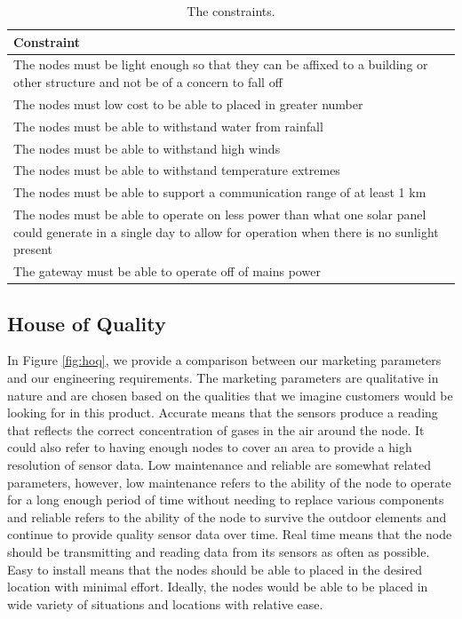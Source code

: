 \begin{table}[H]
\centering
\caption{The constraints.}
\begin{tabularx}{\linewidth}{|X|}
\hline
Constraint \\
\hline
The nodes must be light enough so that they can be affixed to a building or other structure and not be of a concern to fall off \\\hline
The nodes must low cost to be able to placed in greater number \\\hline
The nodes must be able to withstand water from rainfall \\\hline
The nodes must be able to withstand high winds \\\hline
The nodes must be able to withstand temperature extremes \\\hline
The nodes must be able to support a communication range of at least 1 km\\\hline
The nodes must be able to operate on less power than what one solar panel could generate in a single day to allow for operation when there is no sunlight present \\\hline
The gateway must be able to operate off of mains power \\\hline
\end{tabularx}
\label{tab:constraints}
\end{table}

\subsection{House of Quality}
In Figure \ref{fig:hoq}, we provide a comparison between our marketing
parameters and our engineering requirements. The marketing parameters are
qualitative in nature and are chosen based on the qualities that we imagine
customers would be looking for in this product. Accurate means that the sensors
produce a reading that reflects the correct concentration of gases in the air
around the node. It could also refer to having enough nodes to cover an area to
provide a high resolution of sensor data. Low maintenance and reliable are
somewhat related parameters, however, low maintenance refers to the ability of
the node to operate for a long enough period of time without needing to replace
various components and reliable refers to the ability of the node to survive the
outdoor elements and continue to provide quality sensor data over time. Real
time means that the node should be transmitting and reading data from its
sensors as often as possible. Easy to install means that the nodes should be
able to placed in the desired location with minimal effort. Ideally, the nodes
would be able to be placed in wide variety of situations and locations with
relative ease.

